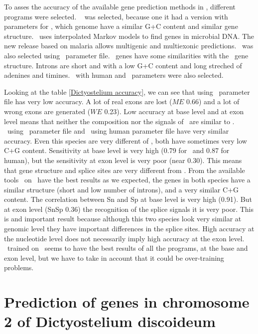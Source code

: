 To asses the accuracy of the available gene prediction methods in \Dd,
different programs were selected. \glimmer\ \citep{delcher:1999a} was
selected, because one it had a version with parameters for \PfL, which
genome have a similar G+C content and similar gene structure. 
\glimmer\ uses interpolated Markov models to find genes in microbial 
DNA. The new release based on malaria allows multigenic and
multiexonic predictions. \genscan\ was also selected using \AtL\
parameter file. \At\ genes have some similarities with the \Dd\ gene
structure. Introns are short and with a low G+C content and long
streched of adenines and timines. \geneid\ with human and \Droso\
parameters were also selected.



Looking at the table \ref{Dictyostelium accuracy}, we can see that
\geneid using \Dm\ parameter file has very low accuracy. A lot of 
real exons are lost ($ME$ 0.66) and a lot of wrong exons are generated
($WE$ 0.23). Low accuracy at base level and at exon level means that
neither the composition nor the signals of \Dm\ are similar to
\Dd. \genscan\ using \At\ parameter file  and \geneid\ using human 
parameter file have very similar accuracy. Even this species are very
different of \Dd, both have sometimes very low C+G
content. Sensitivity at base level is very high (0.79 for \At\ and
0.87 for human), but the sensitivity at exon level is very poor (near
0.30). This means that gene structure and splice sites are very
different from \Dd. From the available tools \glimmer\ on \Pf\ have
the best results as we expected, the genes in both species have a
similar structure (short and low number of introns), and a very
similar C+G content. The correlation between Sn and Sp at base level
is very high (0.91). But at exon level (SnSp 0.36) the recognition of
the splice signals it is very poor. This is and important result
because although this two species look very similar at genomic level
they have important differences in the splice sites.  High accuracy at
the nucleotide level does not necessarily imply high accuracy at the
exon level. \geneid\ trained on \Dd\ seems to have the best results of
all the programs, at the base and exon level, but we have to take in
account that it could be over-training problems.

\section*{Prediction of genes in chromosome 2 of Dictyostelium discoideum}

